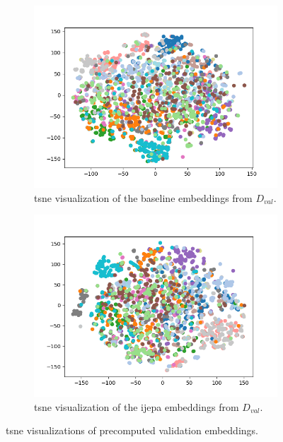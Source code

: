 \begin{multicols}{2}
	\begin{figure}[ht!]
		\begin{subfigure}[t]{.4\linewidth}
			\centering
			\includegraphics[width=1\linewidth]{images/2d_base_val_scatter.png} 
			\caption{\gls{tsne} visualization of the baseline embeddings from $D_{val}$.}
		\end{subfigure}
		\hfill
		\begin{subfigure}[t]{.4\linewidth}
			\centering
			\includegraphics[width=1\linewidth]{images/2d_val_scatter.png} 
			\caption{\gls{tsne} visualization of the \gls{ijepa} embeddings from $D_{val}$.}
		\end{subfigure}
		\caption{\gls{tsne} visualizations of precomputed validation embeddings.}
	\end{figure}
	\label{fig:tsne_embeddings}
\end{multicols}

